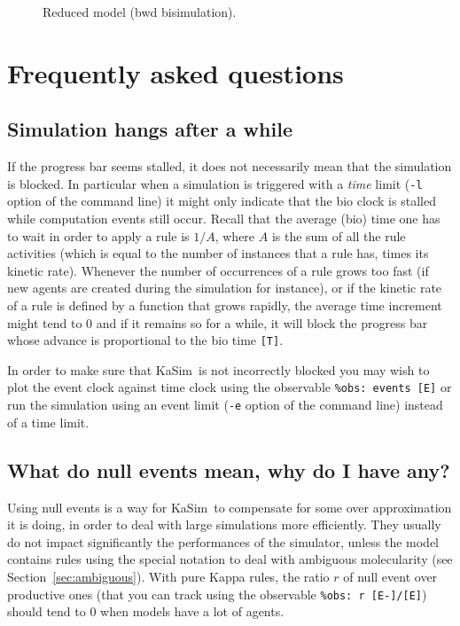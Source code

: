 \documentclass[11pt]{book}
\def\KaSim{\textsf{KaSim}}
\def\ttt#1{\texttt{#1}}
\begin{document}
\begin{figure}[htp]
\centering\begin{minipage}{0.35\linewidth}
\end{minipage}\caption{Reduced model (bwd bisimulation).}
\end{figure}

\chapter{Frequently asked questions}
\section*{Simulation hangs after a while}
If the progress bar seems stalled, it does not necessarily mean that the simulation is blocked. In particular when a simulation is triggered with a \emph{time} limit (\ttt{-l} option of the command line) it might only indicate that the bio clock is stalled while computation events still occur. Recall that the average (bio) time one has to wait in order to apply a rule is $1/A$, where $A$ is the sum of all the rule activities (which is equal to the number of instances that a rule has, times its kinetic rate). Whenever the number of occurrences of a rule grows too fast (if new agents are created during the simulation for instance), or if the kinetic rate of a rule is defined by a function that grows rapidly, the average time increment might tend to 0 and if it remains so for a while, it will block the progress bar whose advance is proportional to the bio time \ttt{[T]}.

In order to make sure that \KaSim~is not incorrectly blocked you may wish to plot the event clock against time clock using the observable \ttt{\%obs: {\textquotesingle}events{\textquotesingle} [E]} or run the simulation using an event limit (\ttt{-e} option of the command line) instead of a time limit.

\section*{What do null events mean, why do I have any?}

Using null events is a way for \KaSim~to compensate for some over approximation it is doing, in order to deal with large simulations more efficiently. They usually do not impact significantly the performances of the simulator, unless the model contains rules using the special notation to deal with ambiguous molecularity (see Section~\ref{sec:ambiguous}). With pure Kappa rules, the ratio $r$ of null event over productive ones (that you can track using the observable \ttt{\%obs: {\textquotesingle}r{\textquotesingle}  [E-]/[E]}) should tend to 0 when models have a lot of agents.
\end{document}
